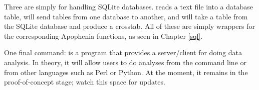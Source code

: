 Three are simply for handling SQLite databases.  
 reads a text file into a database table,
 will send tables from one database to
another, and
 will take a table from the SQLite
database and produce a crosstab. All of these are simply wrappers for
the corresponding Apophenia functions, as seen in Chapter \ref{sql}.

One final command:  is a program that provides a
server/client for doing data analysis. In theory, it will allow users to
do analyses from the command line or from other languages such as Perl
or Python. At the moment, it remains in the proof-of-concept stage;
watch this space for updates.
